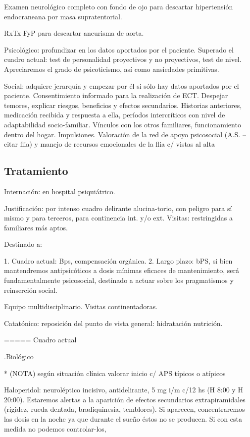 \documentclass{scrbook}
\begin{document}
Examen neurológico completo con fondo de ojo para descartar hipertensión endocraneana por masa supratentorial.

RxTx FyP para descartar aneurisma de aorta.

Psicológico: profundizar en los datos aportados por el paciente. Superado el cuadro actual: test de personalidad proyectivos y no proyectivos, test de nivel. Apreciaremos el grado de psicoticismo, así como ansiedades primitivas.

Social: adquiere jerarquía y empezar por él si sólo hay datos aportados por el paciente. Consentimiento informado para la realización de ECT. Despejar temores, explicar riesgos, beneficios y efectos secundarios. Historias anteriores, medicación recibida y respuesta a ella, períodos intercríticos con nivel de adaptabilidad socio-familiar. Vínculos con los otros familiares, funcionamiento dentro del hogar. Impulsiones. Valoración de la red de apoyo psicosocial (A.S. – citar flia) y manejo de recursos emocionales de la flia c/ vistas al alta
\subsection*{Tratamiento}
Internación: en hospital psiquiátrico.

Justificación: por intenso cuadro delirante alucina-torio, con peligro para sí mismo y para terceros, para continencia int. y/o ext. Visitas: restringidas a familiares más aptos.

Destinado a:

1. Cuadro actual: Bps, compensación orgánica.
2. Largo plazo: bPS, si bien mantendremos antipsicóticos a dosis mínimas eficaces de mantenimiento, será fundamentalmente psicosocial, destinado a actuar sobre los pragmatismos y reinserción social.

Equipo multidisciplinario. Visitas continentadoras.

Catatónico: reposición del punto de vista general: hidratación nutrición.

===== Cuadro actual

.Biológico

* (NOTA) según situación clínica valorar inicio c/ APS típicos o atípicos

Haloperidol: neuroléptico incisivo, antidelirante, 5 mg i/m c/12 hs (H 8:00 y H 20:00). Estaremos alertas a la aparición de efectos secundarios extrapiramidales (rigidez, rueda dentada, bradiquinesia, temblores). Si aparecen, concentraremos las dosis en la noche ya que durante el sueño éstos no se producen. Si con esta medida no podemos controlar-los,
\end{document}

